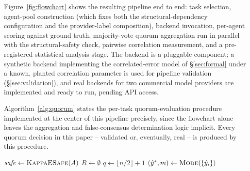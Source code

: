 \documentclass[journal]{IEEEtran}
\begin{document}
Figure~\ref{fig:flowchart} shows the resulting pipeline end to end: task selection, agent-pool construction (which fixes both the structural-dependency configuration and the provider-label composition), backend invocation, per-agent scoring against ground truth, majority-vote quorum aggregation run in parallel with the structural-safety check, pairwise correlation measurement, and a pre-registered statistical analysis stage. The backend is a pluggable component; a synthetic backend implementing the correlated-error model of \S\ref{sec:formal} under a known, planted correlation parameter is used for pipeline validation (\S\ref{sec:validation}), and real backends for two commercial model providers are implemented and ready to run, pending API access.



Algorithm~\ref{alg:quorum} states the per-task quorum-evaluation procedure implemented at the center of this pipeline precisely, since the flowchart alone leaves the aggregation and false-consensus determination logic implicit. Every quorum decision in this paper -- validated or, eventually, real -- is produced by this procedure.

\begin{algorithm}[t]
\caption{Quorum evaluation for a single task}
\label{alg:quorum}
$\mathit{safe} \leftarrow \textsc{KappaESafe}(A)$ 
$R \leftarrow \emptyset$ 
$q \leftarrow \lfloor n/2 \rfloor + 1$ 
$(\hat{y}^\ast, m) \leftarrow \textsc{Mode}(\{\hat{y}_i\})$ 
\end{algorithm}
\end{document}

